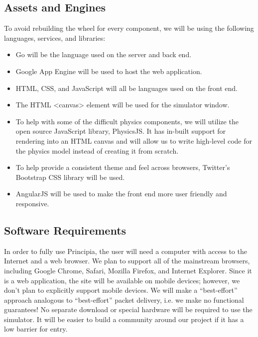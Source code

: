 \subsection{Assets and Engines}

\noindent
To avoid rebuilding the wheel for every component, we will be using the following languages, services, and libraries:
\begin{itemize}
\item Go will be the language used on the server and back end.
\item Google App Engine will be used to host the web application.
\item HTML, CSS, and JavaScript will all be languages used on the front end.
\item The HTML {\textless}canvas{\textgreater} element will be used for the simulator window.
\item To help with some of the difficult physics components, we will utilize the open source JavaScript library, PhysicsJS. It has in-built support for rendering into an HTML canvas and will allow us to write high-level code for the physics model instead of creating it from scratch.
\item To help provide a consistent theme and feel across browsers, Twitter's Bootstrap CSS library will be used.
\item AngularJS will be used to make the front end more user friendly and responsive.
\end{itemize}

\subsection{Software Requirements}

In order to fully use Principia, the user will need a computer with access to the Internet and a web browser. We plan to support all of the mainstream browsers, including Google Chrome, Safari, Mozilla Firefox, and Internet Explorer. Since it is a web application, the site will be available on mobile devices; however, we don't plan to explicitly support mobile devices. We will make a ``best-effort'' approach analogous to ``best-effort'' packet delivery, i.e. we make no functional guarantees! No separate download or special hardware will be required to use the simulator. It will be easier to build a community around our project if it has a low barrier for entry.